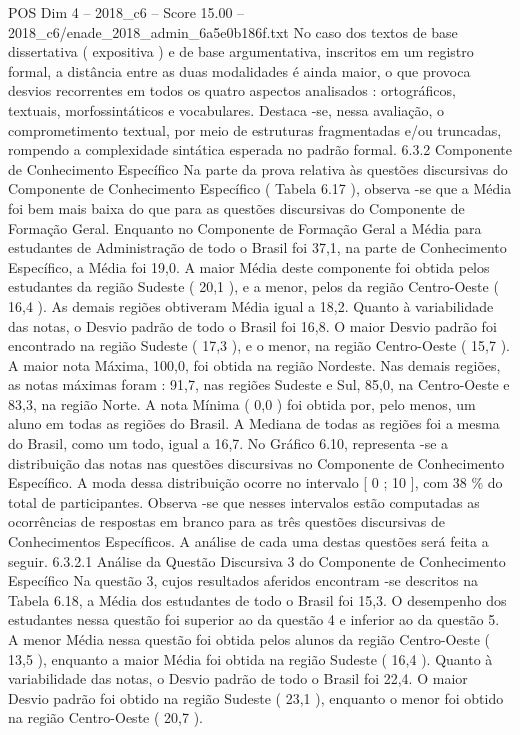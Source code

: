 \begin{textsample}{POS Dim 4 – 2018\_c6 – Score 15.00 – 2018\_c6/enade\_2018\_admin\_6a5e0b186f.txt}
No caso dos textos de base dissertativa ( expositiva ) e de base argumentativa, inscritos em um registro formal, a distância entre as duas modalidades é ainda maior, o que provoca desvios recorrentes em todos os quatro aspectos analisados : ortográficos, textuais, morfossintáticos e vocabulares.
Destaca -se, nessa avaliação, o comprometimento textual, por meio de estruturas fragmentadas e/ou truncadas, rompendo a complexidade sintática esperada no padrão formal. 6.3.2 Componente de Conhecimento Específico Na parte da prova relativa às questões discursivas do Componente de Conhecimento Específico ( Tabela 6.17 ), observa -se que a Média foi bem mais baixa do que para as questões discursivas do Componente de Formação Geral.
Enquanto no Componente de Formação Geral a Média para estudantes de Administração de todo o Brasil foi 37,1, na parte de Conhecimento Específico, a Média foi 19,0.
A maior Média deste componente foi obtida pelos estudantes da região Sudeste ( 20,1 ), e a menor, pelos da região Centro-Oeste ( 16,4 ).
As demais regiões obtiveram Média igual a 18,2.
Quanto à variabilidade das notas, o Desvio padrão de todo o Brasil foi 16,8.
O maior Desvio padrão foi encontrado na região Sudeste ( 17,3 ), e o menor, na região Centro-Oeste ( 15,7 ).
A maior nota Máxima, 100,0, foi obtida na região Nordeste.
Nas demais regiões, as notas máximas foram : 91,7, nas regiões Sudeste e Sul, 85,0, na Centro-Oeste e 83,3, na região Norte.
A nota Mínima ( 0,0 ) foi obtida por, pelo menos, um aluno em todas as regiões do Brasil.
A Mediana de todas as regiões foi a mesma do Brasil, como um todo, igual a 16,7.
No Gráfico 6.10, representa -se a distribuição das notas nas questões discursivas no Componente de Conhecimento Específico.
A moda dessa distribuição ocorre no intervalo [ 0 ; 10 ], com 38 \% do total de participantes.
Observa -se que nesses intervalos estão computadas as ocorrências de respostas em branco para as três questões discursivas de Conhecimentos Específicos.
A análise de cada uma destas questões será feita a seguir. 6.3.2.1 Análise da Questão Discursiva 3 do Componente de Conhecimento Específico Na questão 3, cujos resultados aferidos encontram -se descritos na Tabela 6.18, a Média dos estudantes de todo o Brasil foi 15,3.
O desempenho dos estudantes nessa questão foi superior ao da questão 4 e inferior ao da questão 5.
A menor Média nessa questão foi obtida pelos alunos da região Centro-Oeste ( 13,5 ), enquanto a maior Média foi obtida na região Sudeste ( 16,4 ).
Quanto à variabilidade das notas, o Desvio padrão de todo o Brasil foi 22,4.
O maior Desvio padrão foi obtido na região Sudeste ( 23,1 ), enquanto o menor foi obtido na região Centro-Oeste ( 20,7 ).

\end{textsample}
